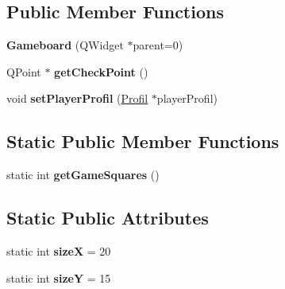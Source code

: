 \subsection*{Public Member Functions}
\begin{DoxyCompactItemize}
\item 
\hypertarget{class_gameboard_a82157069ecfab2d2245b7d5df563aaae}{}{\bfseries Gameboard} (Q\+Widget $\ast$parent=0)\label{class_gameboard_a82157069ecfab2d2245b7d5df563aaae}

\item 
\hypertarget{class_gameboard_a2ae163b581c0ef4aae6bf1ed0ce7965a}{}Q\+Point $\ast$ {\bfseries get\+Check\+Point} ()\label{class_gameboard_a2ae163b581c0ef4aae6bf1ed0ce7965a}

\item 
\hypertarget{class_gameboard_a7ac10eb79b85cecff7fdeda1f31e980b}{}void {\bfseries set\+Player\+Profil} (\hyperlink{class_profil}{Profil} $\ast$player\+Profil)\label{class_gameboard_a7ac10eb79b85cecff7fdeda1f31e980b}

\end{DoxyCompactItemize}
\subsection*{Static Public Member Functions}
\begin{DoxyCompactItemize}
\item 
\hypertarget{class_gameboard_aa10ed162ff321f4fe480e531ef352bd8}{}static int {\bfseries get\+Game\+Squares} ()\label{class_gameboard_aa10ed162ff321f4fe480e531ef352bd8}

\end{DoxyCompactItemize}
\subsection*{Static Public Attributes}
\begin{DoxyCompactItemize}
\item 
\hypertarget{class_gameboard_a50499cde2f942a0d18d261a7103e1e2a}{}static int {\bfseries size\+X} = 20\label{class_gameboard_a50499cde2f942a0d18d261a7103e1e2a}

\item 
\hypertarget{class_gameboard_a1a60c1746c1bfa669b3bf7b3dfc6534d}{}static int {\bfseries size\+Y} = 15\label{class_gameboard_a1a60c1746c1bfa669b3bf7b3dfc6534d}

\end{DoxyCompactItemize}


